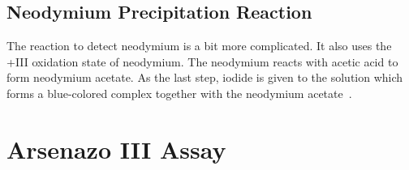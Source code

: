 \subsection{Neodymium Precipitation Reaction}
The reaction to detect neodymium is a bit more complicated.
It also uses the +III oxidation state of neodymium.
The neodymium reacts with acetic acid to form neodymium acetate.
As the last step, iodide is given to the solution which forms a blue-colored complex together with the neodymium acetate~\cite{janderblasius}.

\section{Arsenazo III Assay}
